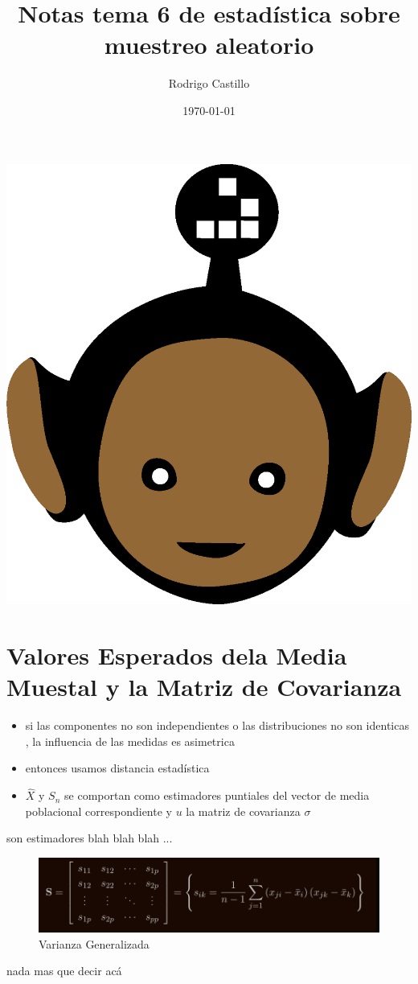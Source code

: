\documentclass[10pt,a4paper]{article} %
\begin{document}
    \title{{  Notas tema 6 de estadística sobre muestreo aleatorio  }}
    \author{{Rodrigo Castillo}}
    \date{\today}

    \maketitle


    \includegraphics[width=0.1\linewidth]{negro_cara.png}

    \section{Valores Esperados dela Media Muestal y la Matriz de Covarianza}
        \begin{itemize}
            \item {si las componentes no son independientes o las
                distribuciones no son identicas , la influencia de las medidas
            es asimetrica}
            \item {entonces usamos distancia estadística}
            \item {$ \hat{X}    $  y $ S_n  $  se comportan como estimadores
                puntiales del vector de media poblacional correspondiente y $
            u$ la matriz de covarianza $ \sigma   $  }
        \end{itemize}

        son estimadores \color{brown} blah blah blah \color{white} ...
        \begin{figure}[h!]
            \centering
            \includegraphics[width=0.8\linewidth]{varianzagen.png}
            \caption{Varianza Generalizada}
            \label{fig:varianzagen}
        \end{figure}

        \color{yellow} nada mas que decir acá \color{white}
        \\



























    \nocite{*}
    
    
\end{document}
